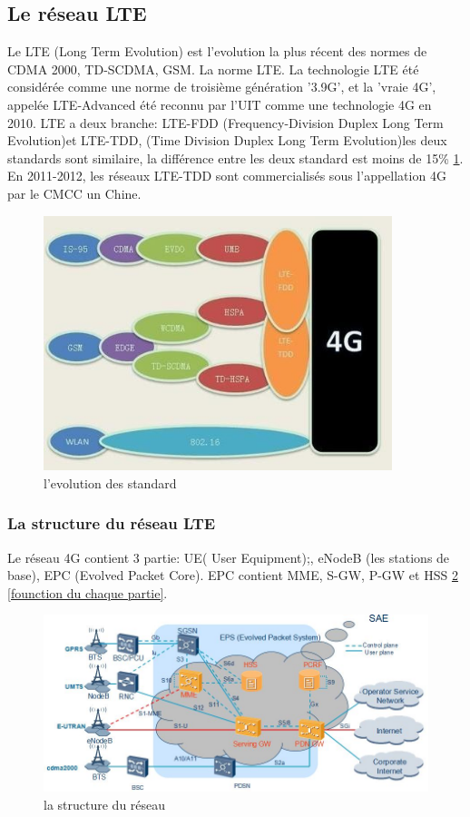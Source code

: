 \subsection{Le réseau LTE}
Le LTE (Long Term Evolution) est l'evolution la plus récent des normes de CDMA 2000, TD-SCDMA, GSM. La norme LTE. La technologie LTE été considérée comme une norme de troisième génération '3.9G', et la 'vraie 4G', appelée LTE-Advanced été reconnu par l'UIT comme une technologie 4G en 2010. LTE a deux branche: LTE-FDD (Frequency-Division Duplex  Long Term Evolution)et LTE-TDD, (Time Division Duplex Long Term Evolution)les deux standards sont similaire, la différence entre les deux standard est moins de 15\% \ref{evolution}. En 2011-2012, les réseaux LTE-TDD sont commercialisés sous l'appellation 4G par le CMCC un Chine.
      \begin{figure}[H]
          \centering
          \includegraphics[width=4in]{images/evolution.JPG}
          \caption{l'evolution des standard}
          \label{evolution}
      \end{figure}
      
\subsubsection{La structure du réseau LTE}
Le réseau 4G contient 3 partie: UE( User Equipment);, eNodeB (les stations de base), EPC (Evolved Packet Core). EPC contient MME, S-GW, P-GW et HSS \ref{structure4G}  \ref{founction du chaque partie}. 
    
      \begin{figure}[H]
          \centering
          \includegraphics[width=5in]{images/enb2.jpg}
          \caption{la structure du réseau}
          \label{structure4G}
      \end{figure}
      
